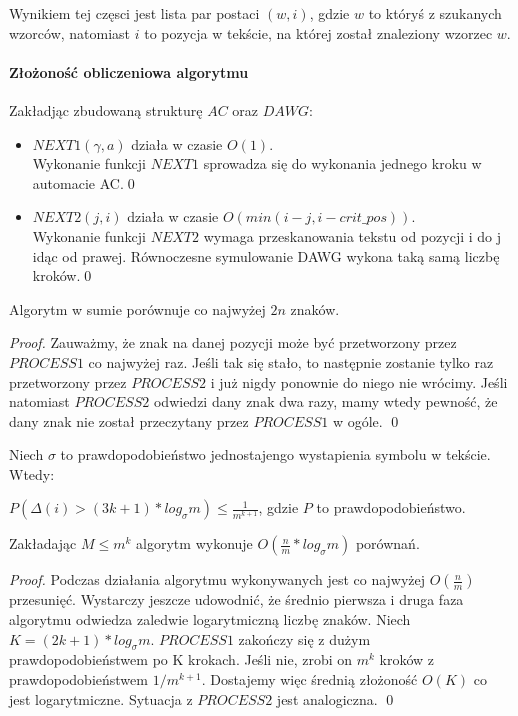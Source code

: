 Wynikiem tej częsci jest lista par postaci $(w, i)$, gdzie $w$ to któryś z szukanych wzorców, natomiast $i$ to pozycja w tekście, na której został znaleziony wzorzec $w$.

\paragraph{Złożoność obliczeniowa algorytmu}

\begin{lemma}{}{}
Zakładjąc zbudowaną strukturę $AC$ oraz $DAWG$:
\begin{itemize}
    \item $NEXT1(\gamma, a)$ działa w czasie $O(1)$. \\
        Wykonanie funkcji $NEXT1$ sprowadza się do wykonania jednego kroku w automacie AC.\qed
    \item $NEXT2(j, i)$ działa w czasie $O(min(i-j, i - crit\_pos))$. \\
        Wykonanie funkcji $NEXT2$ wymaga przeskanowania tekstu od pozycji i do j idąc od prawej. Równoczesne symulowanie DAWG wykona taką samą liczbę kroków.\qed
\end{itemize}
\end{lemma}

\begin{theorem}{}{}
Algorytm w sumie porównuje co najwyżej $2n$ znaków.
\end{theorem}

\begin{proof}
Zauważmy, że znak na danej pozycji może być przetworzony przez $PROCESS1$ co najwyżej raz. Jeśli tak się stało, to następnie zostanie tylko raz przetworzony przez $PROCESS2$ i już nigdy ponownie do niego nie wrócimy. Jeśli natomiast $PROCESS2$ odwiedzi dany znak dwa razy, mamy wtedy pewność, że dany znak nie został przeczytany przez $PROCESS1$ w ogóle. \qed
\end{proof}

Niech $\sigma$ to prawdopodobieństwo jednostajengo wystapienia symbolu w tekście. Wtedy:

\begin{lemma}{}{}
$P(\Delta(i) > (3k + 1)*log_{\sigma}m) \leq \frac{1}{m^{k+1}}$, gdzie $P$ to prawdopodobieństwo.
\end{lemma}

\begin{theorem}{}{}
Zakładając $M \leq m^k$ algorytm wykonuje $O(\frac{n}{m} * log_{\sigma} m)$ porównań.
\end{theorem}

\begin{proof}
Podczas działania algorytmu wykonywanych jest co najwyżej $O(\frac{n}{m})$ przesunięć.
Wystarczy jeszcze udowodnić, że średnio pierwsza i druga faza algorytmu odwiedza zaledwie logarytmiczną liczbę znaków. Niech $K = (2k + 1) * log _{\sigma} m$. $PROCESS1$ zakończy się z dużym prawdopodobieństwem po K krokach. Jeśli nie, zrobi on $m^k$ kroków z prawdopodobieństwem $1/m^{k+1}$. Dostajemy więc średnią złożoność $O(K)$ co jest logarytmiczne.
Sytuacja z $PROCESS2$ jest analogiczna. \qed
\end{proof}